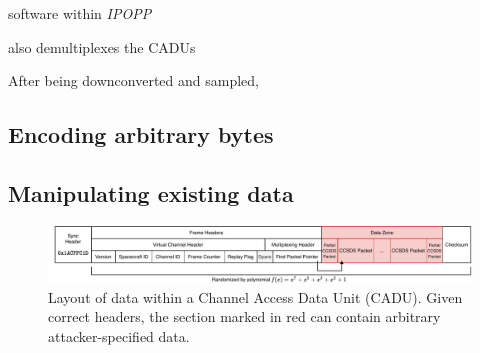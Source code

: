 software within \textit{IPOPP}




also demultiplexes the CADUs

After being downconverted and sampled, 




\subsection{Encoding arbitrary bytes}

\subsection{Manipulating existing data}


\begin{figure}
    \centering
    \includegraphics[width=\textwidth]{diagrams/cadu_diagram.pdf}
    \caption{Layout of data within a Channel Access Data Unit (CADU). Given correct headers, the section marked in red can contain arbitrary attacker-specified data.}
    \label{fig:cadu_diagram}
\end{figure}




